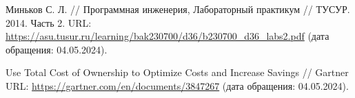 \begin{thebibliography}{99\kern\bibindent}
	 Миньков С. Л. // Программная инженерия, Лабораторный практикум // ТУСУР. 2014. Часть 2. URL: \url{https://asu.tusur.ru/learning/bak230700/d36/b230700_d36_labs2.pdf} (дата обращения: 04.05.2024).

	 Use Total Cost of Ownership to Optimize Costs and Increase Savings // Gartner URL: \url{https://gartner.com/en/documents/3847267} (дата обращения: 04.05.2024).
\end{thebibliography}